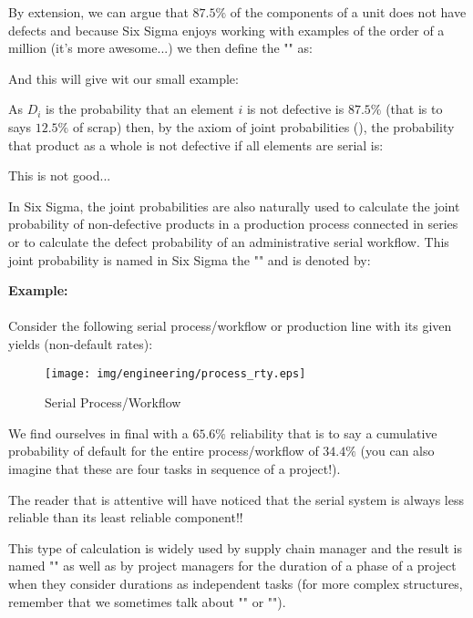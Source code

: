 By extension, we can argue that $87.5\%$ of the components of a unit does not have defects and because Six Sigma enjoys working with examples of the order of a million (it's more awesome...) we then define the "" as:
	
And this will give wit our small example:
	
	As $D_i$ is the probability that an element $i$ is not defective is $87.5\%$ (that is to says $12.5\%$ of scrap) then, by the axiom of joint probabilities (), the probability that product as a whole is not defective if all elements are serial is:
	
	This is not good...

	In Six Sigma, the joint probabilities are also naturally used to calculate the joint probability of non-defective products in a production process connected in series or to calculate the defect probability of an administrative serial workflow. This joint probability is named in Six Sigma the "" and is denoted by:
	
	\pagebreak

	\begin{tcolorbox}[colframe=black,colback=white,sharp corners]
	\textbf{{\Large {}}Example:}\\\\
	Consider the following serial process/workflow or production line with its given yields (non-default rates):

	\begin{figure}[H]
		\centering
		\texttt{[image: img/engineering/process\_rty.eps]}
		\caption{Serial Process/Workflow}
	\end{figure}
	
	We find ourselves in final with a $65.6\%$ reliability that is to say a cumulative probability of default for the entire process/workflow of $34.4\%$ (you can also imagine that these are four tasks in sequence of a project!).
	\end{tcolorbox}
	\begin{tcolorbox}[title=Remark,colframe=black,arc=10pt]
The reader that is attentive will have noticed that the serial system is always less reliable than its least reliable component!!
	\end{tcolorbox}
	
This type of calculation is widely used by supply chain manager and the result is named "" as well as by project managers for the duration of a phase of a project when they consider durations as independent tasks (for more complex structures, remember that we sometimes talk about "" or "").


